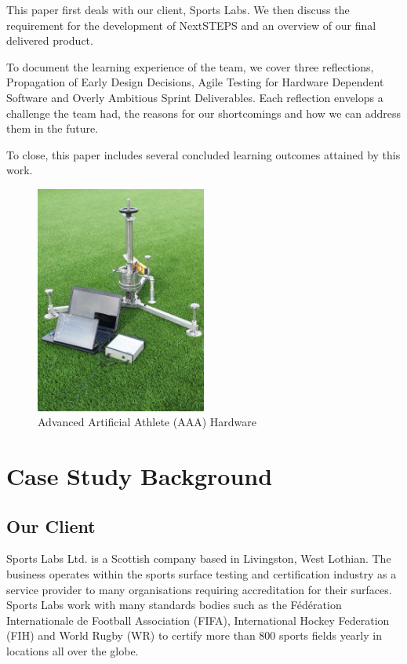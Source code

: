 \documentclass{l3proj}
\begin{document}
This paper first deals with our client, Sports Labs. We then discuss the requirement for the development of NextSTEPS and an overview of our final delivered product. 

To document the learning experience of the team, we cover three reflections, Propagation of Early Design Decisions, Agile Testing for Hardware Dependent Software and Overly Ambitious Sprint Deliverables. Each reflection envelops a challenge the team had, the reasons for our shortcomings and how we can address them in the future. 

To close, this paper includes several concluded learning outcomes attained by this work. 

\begin{figure}[h]
\label{fig:AAA}
\centering
\includegraphics[width=0.5\textwidth]{./images/AAA+3.png}
\caption{Advanced Artificial Athlete (AAA) Hardware \cite{sportstestequip} }
\end{figure}
\section{Case Study Background}
\subsection{Our Client}
Sports Labs Ltd. is a Scottish company based in Livingston, West Lothian. The business operates within the sports surface testing and certification industry as a service provider to many organisations requiring accreditation for their surfaces. Sports Labs work with many standards bodies such as the Fédération Internationale de Football Association (FIFA), International Hockey Federation (FIH) and World Rugby (WR) to certify more than 800 sports fields yearly in locations all over the globe. 
\end{document}
